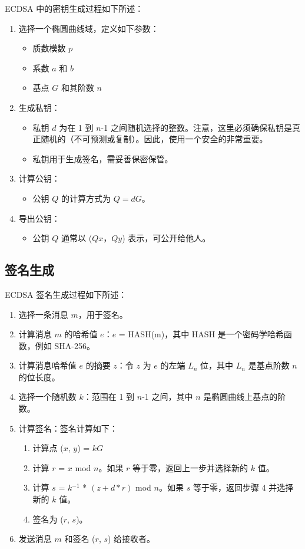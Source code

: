 \documentclass[main\_\_CN.tex]{subfiles}
\begin{document}
ECDSA 中的密钥生成过程如下所述：
\begin{enumerate}
    \item 选择一个椭圆曲线域，定义如下参数：
    \begin{itemize}
        \item 质数模数 $p$
        \item 系数 $a$ 和 $b$
        \item 基点 $G$ 和其阶数 $n$
    \end{itemize}
    \item 生成私钥：
    \begin{itemize}
        \item 私钥 $d$ 为在 1 到 $n$-1 之间随机选择的整数。注意，这里必须确保私钥是真正随机的（不可预测或复制）。因此，使用一个安全的\textit{}非常重要。
        \item 私钥用于生成签名，需妥善保密保管。
    \end{itemize}
    \item 计算公钥：
    \begin{itemize}
        \item 公钥 $Q$ 的计算方式为 $Q = dG$。
    \end{itemize}
    \item 导出公钥：
    \begin{itemize}
        \item 公钥 $Q$ 通常以 ($Qx$，$Qy$) 表示，可公开给他人。
    \end{itemize}
\end{enumerate}

\subsection{签名生成}

ECDSA 签名生成过程如下所述：

\begin{enumerate}
    \item 选择一条消息 $m$，用于签名。
    \item 计算消息 $m$ 的哈希值 $e$：$e$ = HASH(m)，其中 HASH 是一个密码学哈希函数，例如 SHA-256。
    \item 计算消息哈希值 $e$ 的摘要 $z$：令 $z$ 为 $e$ 的左端 $L_n$ 位，其中 $L_n$ 是基点阶数 $n$ 的位长度。
    \item 选择一个随机数 $k$：范围在 1 到 $n$-1 之间，其中 $n$ 是椭圆曲线上基点的阶数。
    \item 计算签名：签名计算如下：
          \begin{enumerate}
              \item 计算点 ($x$, $y$) = $kG$
              \item 计算 $r$ = $x$ \textrm{mod} $n$。如果 $r$ 等于零，返回上一步并选择新的 $k$ 值。
              \item 计算 $s$ = $k$$^{-1}$ * $(z + d*r)$ \textrm{mod} $n$。如果 $s$ 等于零，返回步骤 4 并选择新的 $k$ 值。
              \item 签名为 ($r$, $s$)。
          \end{enumerate}
    \item 发送消息 $m$ 和签名 ($r$, $s$) 给接收者。
\end{enumerate}
\end{document}
